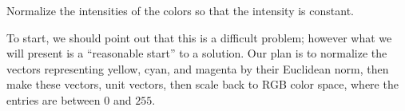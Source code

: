 \documentclass{ximera}
\begin{document}
\begin{example}
\begin{center}
  \end{center}
  Normalize the intensities of the colors so that the
  intensity is constant.
  \begin{explanation}
    To start, we should point out that this is a difficult problem;
    however what we will present is a ``reasonable start'' to
    a solution.  Our plan is to normalize the vectors representing
    yellow, cyan, and magenta by their Euclidean norm, then make
    these vectors, unit vectors, then scale back to RGB color space,
    where the entries are between $0$ and $255$.


\end{explanation}
\end{example}
\end{document}
